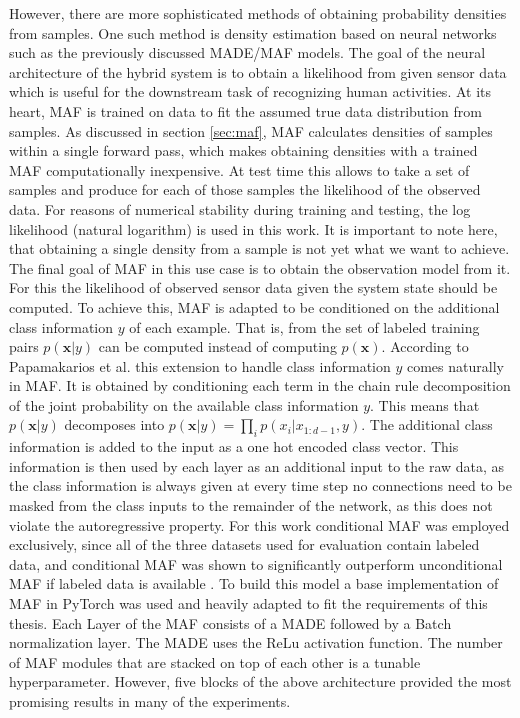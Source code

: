 \documentclass[11pt,titlepage,oneside,openany]{book}
\begin{document}
However, there are more sophisticated methods of obtaining probability densities from samples. One such method is density estimation based on neural networks such as the previously discussed MADE/MAF models. The goal of the neural architecture of the hybrid system is to obtain a likelihood from given sensor data which is useful for the downstream task of recognizing human activities. At its heart, MAF is trained on data to fit the assumed true data distribution from samples. As discussed in section \ref{sec:maf}, MAF calculates densities of samples within a single forward pass, which makes obtaining densities with a trained MAF computationally inexpensive. At test time this allows to take a set of samples and produce for each of those samples the likelihood of the observed data. For reasons of numerical stability during training and testing, the log likelihood (natural logarithm) is used in this work. It is important to note here, that obtaining a single density from a sample is not yet what we want to achieve. The final goal of MAF in this use case is to obtain the observation model from it. For this the likelihood of observed sensor data given the system state should be computed. To achieve this, MAF is adapted to be conditioned on the additional class information $y$ of each example. That is, from the set of labeled training pairs $p(\pmb{x}|y)$ can be computed instead of computing $p(\pmb{x})$. According to Papamakarios et al. \cite{papamakarios_masked_2017} this extension to handle class information $y$ comes naturally in MAF. It is obtained by conditioning each term in the chain rule decomposition of the joint probability on the available class information $y$. This means that $p(\pmb{x}|y)$ decomposes into $p(\pmb{x}|y) = \prod_{i}^{} p(x_i|x_{1:d-1},y)$. The additional class information is added to the input as a one hot encoded class vector. This information is then used by each layer as an additional input to the raw data, as the class information is always given at every time step no connections need to be masked from the class inputs to the remainder of the network, as this does not violate the autoregressive property. For this work conditional MAF was employed exclusively, since all of the three datasets used for evaluation contain labeled data, and conditional MAF was shown to significantly outperform unconditional MAF if labeled data is available \cite{papamakarios_masked_2017}. To build this model a base implementation of MAF in PyTorch \cite{kostrikov_pytorch-flows_2022} was used and heavily adapted to fit the requirements of this thesis. Each Layer of the MAF consists of a MADE followed by a Batch normalization layer. The MADE uses the ReLu activation function. The number of MAF modules that are stacked on top of each other is a tunable hyperparameter. However, five blocks of the above architecture provided the most promising results in many of the experiments.
\end{document}
